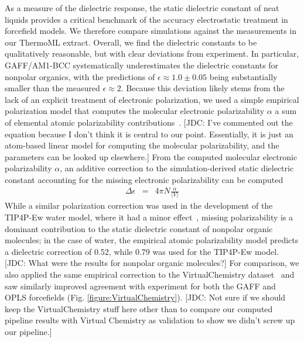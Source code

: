 \documentclass[aps,pre,twocolumn,nofootinbib,superscriptaddress,linenumbers]{revtex4-1}
\begin{document}
As a measure of the dielectric response, the static dielectric constant of neat liquids provides a critical benchmark of the accuracy electrostatic treatment in forcefield models.  
We therefore compare simulations against the measurements in our ThermoML extract.  
Overall, we find the dielectric constants to be qualitatively reasonable, but with clear deviations from experiment.  
In particular, GAFF/AM1-BCC systematically underestimates the dielectric constants for nonpolar organics, with the predictions of $\epsilon \approx 1.0 \pm 0.05$ being substantially smaller than the measured $\epsilon \approx 2$.  
Because this deviation likely stems from the lack of an explicit treatment of electronic polarization, we used a simple empirical polarization model that computes the molecular electronic polarizability $\alpha$ a sum of elemental atomic polarizability contributions~\cite{bosque2002polarizabilities}.
{\color{red}[JDC: I've commented out the equation because I don't think it is central to our point. Essentially, it is just an atom-based linear model for computing the molecular polarizability, and the parameters can be looked up elsewhere.]}
From the computed molecular electronic polarizability $\alpha$, an additive correction to the simulation-derived static dielectric constant accounting for the missing electronic polarizability can be computed~\cite{horn2004}
\begin{eqnarray}
\Delta \epsilon &=& 4 \pi N  \frac{\alpha}{\langle V \rangle} \label{equation:dielectric correction}
\end{eqnarray}
While a similar polarization correction was used in the development of the TIP4P-Ew water model, where it had a minor effect~\cite{horn2004}, missing polarizability is a dominant contribution to the static dielectric constant of nonpolar organic molecules;   
in the case of water, the empirical atomic polarizability model predicts a dielectric correction of 0.52, while 0.79 was used for the TIP4P-Ew model.  
{\color{red}[JDC: What were the results for nonpolar organic molecules?]}
For comparison, we also applied the same empirical correction to the VirtualChemistry dataset~\cite{caleman2011force, van2012gromacs} and saw similarly improved agreement with experiment for both the GAFF and OPLS forcefields (Fig. \ref{figure:VirtualChemistry}).
{\color{red}[JDC: Not sure if we should keep the VirtualChemistry stuff here other than to compare our computed pipeline results with Virtual Chemistry as validation to show we didn't screw up our pipeline.]}
\end{document}
